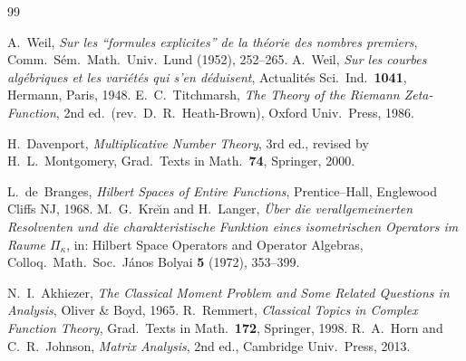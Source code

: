 \documentclass[11pt]{amsart}
\theoremstyle{definition}
\theoremstyle{remark}
\theoremstyle{definition}
\begin{document}
\begin{thebibliography}{99}


 A.~Weil, \emph{Sur les ``formules explicites'' de la th\'eorie des nombres premiers},
Comm.\ S\'em.\ Math.\ Univ.\ Lund (1952), 252--265.
 A.~Weil, \emph{Sur les courbes alg\'ebriques et les vari\'et\'es qui s'en d\'eduisent},
Actualit\'es Sci.\ Ind.\ \textbf{1041}, Hermann, Paris, 1948.
 E.~C.~Titchmarsh, \emph{The Theory of the Riemann Zeta-Function}, 2nd ed.\ (rev.\
D.~R.~Heath-Brown), Oxford Univ.\ Press, 1986.

 H.~Davenport, \emph{Multiplicative Number Theory}, 3rd ed., revised by
H.~L.~Montgomery, Grad.\ Texts in Math.\ \textbf{74}, Springer, 2000.

 L.~de~Branges, \emph{Hilbert Spaces of Entire Functions}, Prentice--Hall, Englewood
Cliffs NJ, 1968.
 M.~G.~Kre\u{\i}n and H.~Langer, \emph{\"Uber die verallgemeinerten Resolventen und
die charakteristische Funktion eines isometrischen Operators im Raume $\Pi_\kappa$}, in: Hilbert Space
Operators and Operator Algebras, Colloq.\ Math.\ Soc.\ J\'anos Bolyai \textbf{5} (1972), 353--399.

 N.~I.~Akhiezer, \emph{The Classical Moment Problem and Some Related Questions in
Analysis}, Oliver \& Boyd, 1965.
 R.~Remmert, \emph{Classical Topics in Complex Function Theory}, Grad.\ Texts in Math.\
\textbf{172}, Springer, 1998.
\bibitem{HornJohnson} R.~A.~Horn and C.~R.~Johnson, \emph{Matrix Analysis}, 2nd ed., Cambridge Univ.\
Press, 2013.


\end{thebibliography}
\end{document}

